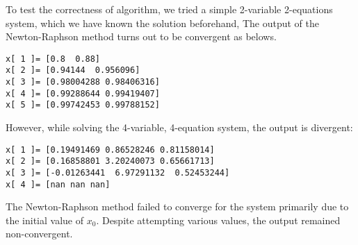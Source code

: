 \documentclass[ %
    final,
    scrbook,
    listoffigures,
    listoftables, 
    glossary]{cu-thesis}
\begin{document}
To test the correctness of algorithm, we tried a simple 2-variable 2-equations system, which we have known the solution beforehand, The output of the Newton-Raphson method turns out to be convergent as belows.
\begin{lstlisting}
x[ 1 ]= [0.8  0.88]
x[ 2 ]= [0.94144  0.956096]
x[ 3 ]= [0.98004288 0.98406316]
x[ 4 ]= [0.99288644 0.99419407]
x[ 5 ]= [0.99742453 0.99788152]
\end{lstlisting}
However, while solving the 4-variable, 4-equation system, the output is divergent:
\begin{lstlisting}
x[ 1 ]= [0.19491469 0.86528246 0.81158014]
x[ 2 ]= [0.16858801 3.20240073 0.65661713]
x[ 3 ]= [-0.01263441  6.97291132  0.52453244]
x[ 4 ]= [nan nan nan]
\end{lstlisting}
The Newton-Raphson method failed to converge for the system primarily due to the initial value of $x_0$. Despite attempting various values, the output remained non-convergent.
    
    
    
\end{document}
